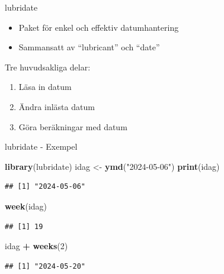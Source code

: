 \documentclass[
  11pt,
  ignorenonframetext,
  handout]{beamer}
\newenvironment{Shaded}{\begin{snugshade}}{\end{snugshade}}
\newcommand{\DecValTok}[1]{\textcolor[rgb]{0.00,0.00,0.81}{#1}}
\newcommand{\FunctionTok}[1]{\textcolor[rgb]{0.13,0.29,0.53}{\textbf{#1}}}
\newcommand{\NormalTok}[1]{#1}
\newcommand{\OtherTok}[1]{\textcolor[rgb]{0.56,0.35,0.01}{#1}}
\newcommand{\SpecialCharTok}[1]{\textcolor[rgb]{0.81,0.36,0.00}{\textbf{#1}}}
\newcommand{\StringTok}[1]{\textcolor[rgb]{0.31,0.60,0.02}{#1}}
\providecommand{\tightlist}{%
  \setlength{\itemsep}{0pt}\setlength{\parskip}{0pt}}
\begin{document}
\begin{frame}{lubridate}
\protect{}\label{lubridate}
\begin{itemize}
\tightlist
\item
  Paket för enkel och effektiv datumhantering
\item
  Sammansatt av ``lubricant'' och ``date''
\end{itemize}

Tre huvudsakliga delar:

\begin{enumerate}
\tightlist
\item
  Läsa in datum
\item
  Ändra inlästa datum
\item
  Göra beräkningar med datum
\end{enumerate}
\end{frame}

\begin{frame}[fragile]{lubridate - Exempel}
\protect{}\label{lubridate---exempel}
\begin{Shaded}
\begin{Highlighting}[]
\FunctionTok{library}\NormalTok{(lubridate)}
\NormalTok{idag }\OtherTok{\textless{}{-}} \FunctionTok{ymd}\NormalTok{(}\StringTok{"2024{-}05{-}06"}\NormalTok{)}
\FunctionTok{print}\NormalTok{(idag)}
\end{Highlighting}
\end{Shaded}

\begin{verbatim}
## [1] "2024-05-06"
\end{verbatim}

\begin{Shaded}
\begin{Highlighting}[]
\FunctionTok{week}\NormalTok{(idag)}
\end{Highlighting}
\end{Shaded}

\begin{verbatim}
## [1] 19
\end{verbatim}

\begin{Shaded}
\begin{Highlighting}[]
\NormalTok{idag }\SpecialCharTok{+} \FunctionTok{weeks}\NormalTok{(}\DecValTok{2}\NormalTok{)}
\end{Highlighting}
\end{Shaded}

\begin{verbatim}
## [1] "2024-05-20"
\end{verbatim}
\end{frame}
\end{document}

